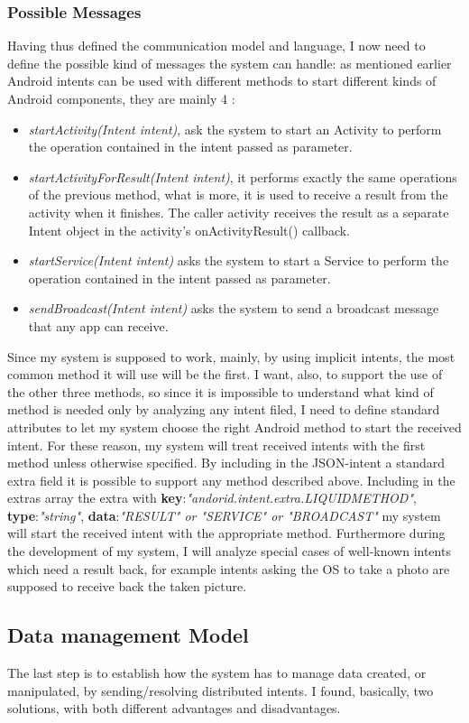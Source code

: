 \subsubsection{Possible Messages} \label{pm}
Having thus defined the communication model and language, I now need to define the possible kind of messages the system can handle: as mentioned earlier Android intents can be used with different methods to start different kinds of Android components, they are mainly 4 : 
\begin{itemize}
	\item \textit{startActivity(Intent intent)}, ask the system to start an Activity to perform the operation contained in the intent passed as parameter.
	\item \textit{startActivityForResult(Intent intent)}, it performs exactly the same operations of the previous method, what is more, it is used to receive a result from the activity when it finishes. The caller activity receives the result as a separate Intent object in the activity's onActivityResult() callback.
	\item \textit{startService(Intent intent)} asks the system to start a Service to perform the operation contained in the intent passed as parameter.
	\item \textit{sendBroadcast(Intent intent)} asks the system to send a broadcast message that any app can receive.
\end{itemize}
Since my system is supposed to work, mainly, by using implicit intents, the most common method it will use will be the first. I want, also, to support the use of the other three methods, so since it is impossible to understand what kind of method is needed only by analyzing any intent filed, I need to define standard attributes to let my system choose the right Android method to start the received intent. For these reason,  my system will treat received intents with the first method unless otherwise specified. By including in the JSON-intent a standard extra field it is possible to support any method described above. Including in the extras array the extra with \textbf{key}:\textit{"andorid.intent.extra.LIQUIDMETHOD"}, \textbf{type}:\textit{"string"}, \textbf{data}:\textit{"RESULT" or "SERVICE" or "BROADCAST"} my system will start the received intent with the appropriate method. Furthermore during the development of my system, I will analyze special cases of well-known intents which need a result back, for example intents asking the OS to take a photo are supposed to receive back the taken picture.
 \subsection{Data management Model}
 The last step is to establish how the system has to manage data created, or manipulated, by sending/resolving distributed intents. I found, basically, two solutions, with both different advantages and disadvantages.

